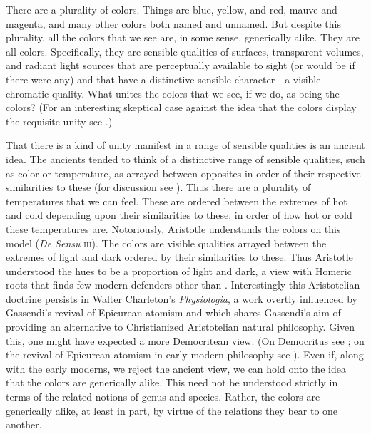 \documentclass[12pt]{article}
\begin{document}

There are a plurality of colors. Things are blue, yellow, and red, mauve and magenta, and many other colors both named and unnamed. But despite this plurality, all the colors that we see are, in some sense, generically alike. They are all colors. Specifically, they are sensible qualities of surfaces, transparent volumes, and radiant light sources that are perceptually available to sight (or would be if there were any) and that have a distinctive sensible character---a visible chromatic quality. What unites the colors that we see, if we do, as being the colors? (For an interesting skeptical case against the idea that the colors display the requisite unity see \citealt{Matthen:1999ma}.)

That there is a kind of unity manifest in a range of sensible qualities is an ancient idea. The ancients tended to think of a distinctive range of sensible qualities, such as color or temperature, as arrayed between opposites in order of their respective similarities to these (for discussion see \citealt{Lloyd:1966ly}). Thus there are a plurality of temperatures that we can feel. These are ordered between the extremes of hot and cold depending upon their similarities to these, in order of how hot or cold these temperatures are. Notoriously, Aristotle understands the colors on this model (\emph{De Sensu} \textsc{iii}). The colors are visible qualities arrayed between the extremes of light and dark ordered by their similarities to these. Thus Aristotle understood the hues to be a proportion of light and dark, a view with Homeric roots \citep{Gladstone:1858fk} that finds few modern defenders other than \citet{Goethe:1810uq}. Interestingly this Aristotelian doctrine persists in Walter Charleton's \citeyear{Charleton:1654fk} \emph{Physiologia}, a work overtly influenced by Gassendi's revival of Epicurean atomism and which shares Gassendi's aim of providing an alternative to Christianized Aristotelian natural philosophy. Given this, one might have expected a more Democritean view. (On Democritus see \citealt{Lee:2005qr,Pasnau:2007kx}; on the revival of Epicurean atomism in early modern philosophy see \citealt{Wilson:2008nr}). Even if, along with the early moderns, we reject the ancient view, we can hold onto the idea that the colors are generically alike. This need not be understood strictly in terms of the related notions of genus and species. Rather, the colors are generically alike, at least in part, by virtue of the relations they bear to one another. 
\end{document}

